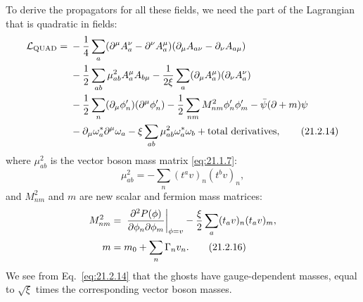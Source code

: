 To derive the propagators for all these fields, we need the part of the
Lagrangian that is quadratic in fields:
\begin{align}
 \mathcal L_{\mathrm{QUAD}}={}&
 -\frac14\sum_a
 (\partial^\mu A_a^\nu-\partial^\nu A_a^\mu)
 (\partial_\mu A_{a\nu}-\partial_\nu A_{a\mu})
 \notag\\
 &-\frac12\sum_{ab}\mu^2_{ab}
 A_a^\mu A_{b\mu}
 -\frac1{2\xi}\sum_a
 (\partial_\mu A_a^\mu)(\partial_\nu A_a^\nu)
 \notag\\
 &-\frac12\sum_n(\partial_\mu\phi'_n)(\partial^\mu\phi'_n)
 -\frac12\sum_{nm}M^2_{nm}\phi'_n\phi'_m
 -\bar\psi(\sl{\partial}+m)\psi
 \notag\\
 &-\partial_\mu\omega_a^*\partial^\mu\omega_a
 -\xi\sum_{ab}\mu^2_{ab}
 \omega_a^*\omega_b
 +\text{total derivatives},
 \tag{21.2.14}\label{eq:21.2.14}
\end{align}
where $\mu^2_{ab}$ is the vector boson mass matrix
\eqref{eq:21.1.7}:
\begin{equation}
 \mu^2_{ab}
 =-\sum_n(t^a v)_n(t^b v)_n,
 \tag{21.2.15}\label{eq:21.2.15}
\end{equation}
and $M^2_{nm}$ and $m$ are new scalar and fermion mass matrices:
\begin{align}
 M^2_{nm}
 ={}&\left.
 \frac{\partial^2P(\phi)}{\partial\phi_n\partial\phi_m}
 \right|_{\phi=v}
 -\frac{\xi}{2}\sum_a
 (t_a v)_n(t_a v)_m,
 \notag\\
 m={}&m_0+\sum_n\Gamma_n v_n.
 \tag{21.2.16}\label{eq:21.2.16}
\end{align}
We see from Eq.~\eqref{eq:21.2.14} that the ghosts have gauge-dependent
masses, equal to $\sqrt{\xi}$ times the corresponding vector boson masses.

